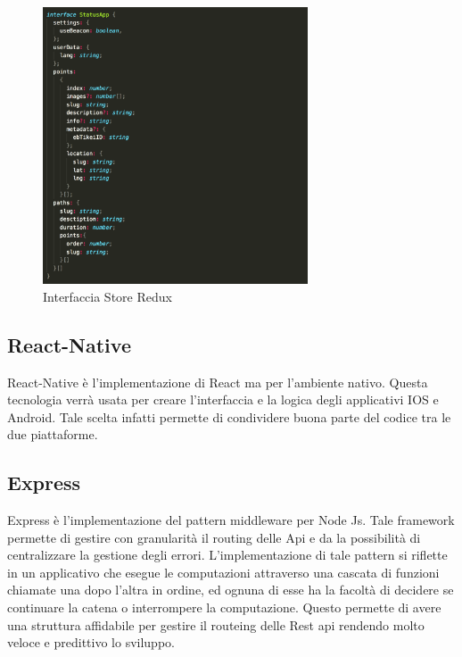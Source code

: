 \begin{figure}[h]
\centering
\includegraphics[width=0.7\textwidth]{images/store.png}
\caption{Interfaccia Store Redux}
\end{figure}
\vspace{5mm}

\subsection{React-Native}\vspace{5mm}

	React-Native è l'implementazione di React ma per l’ambiente nativo. Questa tecnologia verrà usata per creare l’interfaccia e la logica degli applicativi IOS e Android. Tale scelta infatti permette di condividere buona parte del codice tra le due piattaforme.\vspace{5mm}

\subsection{Express}\vspace{5mm}

	Express è l'implementazione del pattern middleware per Node Js. Tale framework permette di gestire con granularità il routing delle Api e da la possibilità di centralizzare la gestione degli errori. L'implementazione di tale pattern si riflette in un applicativo che esegue le computazioni attraverso una cascata di funzioni chiamate una dopo l'altra in ordine, ed ognuna di esse ha la facoltà di decidere se continuare la catena o interrompere la computazione. Questo permette di avere una struttura affidabile per gestire il routeing delle Rest api rendendo molto veloce e predittivo lo sviluppo.\vspace{5mm}


